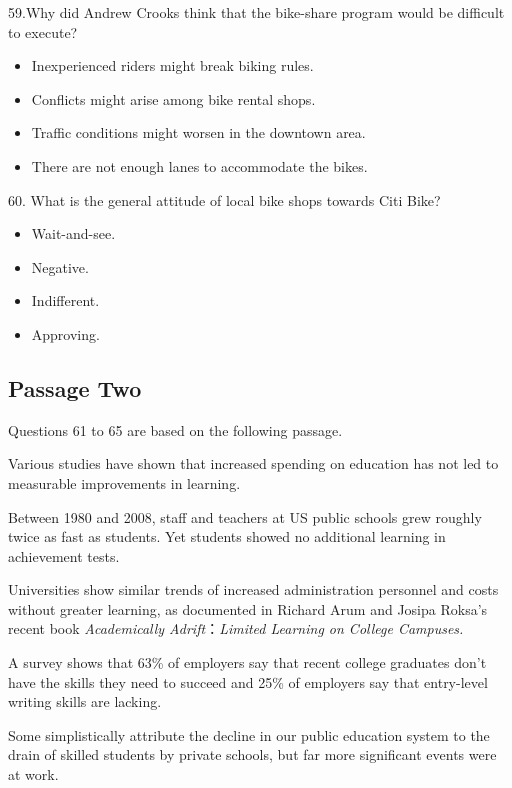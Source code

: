 \documentclass[UTF8,11pt]{ctexart}
\begin{document}
59.Why did Andrew Crooks think that the bike-share program would be difficult to execute?


\begin{itemize}[leftmargin=2em,itemsep=.2em,topsep=.4em]\item[A.] Inexperienced riders might break biking rules.
\item[B.] Conflicts might arise among bike rental shops.
\item[C.] Traffic conditions might worsen in the downtown area.
\item[D.] There are not enough lanes to accommodate the bikes.
\end{itemize}

60. What is the general attitude of local bike shops towards Citi Bike?


\begin{itemize}[leftmargin=2em,itemsep=.2em,topsep=.4em]\item[A.] Wait-and-see.
\item[B.] Negative.
\item[C.] Indifferent.
\item[D.] Approving.
\end{itemize}

\subsection*{Passage Two}


Questions 61 to 65 are based on the following passage.


Various studies have shown that increased spending on education has not led to measurable improvements in learning.


Between 1980 and 2008, staff and teachers at US public schools grew roughly twice as fast as students. Yet students showed no additional learning in achievement tests.


Universities show similar trends of increased administration personnel and costs without greater learning, as documented in Richard Arum and Josipa Roksa’s recent book\textit{ Academically Adrift}：\textit{Limited Learning on College Campuses.}


A survey shows that 63\% of employers say that recent college graduates don’t have the skills they need to succeed and 25\% of employers say that entry-level writing skills are lacking.


Some simplistically attribute the decline in our public education system to the drain of skilled students by private schools, but far more significant events were at work.
\end{document}

